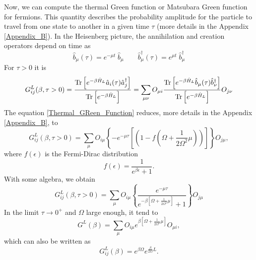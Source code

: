 Now, we can compute the thermal Green function or Matsubara Green function for fermions. This quantity describes the probability amplitude for the particle to travel from one state to another in a given time $\tau$ (more details in the Appendix \ref{Appendix_B}).
In the Heisenberg picture, the annihilation and creation operators depend on time \cite{Coleman_2015} as
\begin{equation}
    \hat b_\mu (\tau) = e^{-\mu t}\; \hat b_\mu \qquad \hat b_\mu^\dagger (\tau) = e^{\mu t} \;\hat b_\mu^\dagger
\end{equation}
For $\tau > 0$ it is
\begin{equation}\label{Thermal_GReen_Function}
    \begin{split}
        G^L_{ij}(\beta, \tau > 0) &= \frac{\operatorname{Tr}\left[e^{-\beta \hat H_L}\hat a_i (\tau)  \hat a_j^\dagger\right]}{\operatorname{Tr}\left[e^{-\beta \hat H_L}\right]} =\sum_{\mu\nu} O_{\mu i}\frac{\operatorname{Tr}\left[ e^{-\beta \hat H_L} \hat b_\mu (\tau)\hat b_\nu^\dagger\right]}{\operatorname{Tr}\left[e^{-\beta \hat H_L}\right]}O_{j\nu}\\
    \end{split}
\end{equation}
The equation \eqref{Thermal_GReen_Function} reduces, more details in the Appendix \ref{Appendix_B}, to
\begin{equation}
    G^L_{ij}(\beta, \tau > 0) = \sum_{\mu} O_{i\mu}\left\{-e^{-\mu \tau}\left[\left(1-f\left( \Omega + \frac{1}{2\Omega^2}\mu\right)\right)\right]\right\}O_{j\mu},
\end{equation} 
where $f(\epsilon)$ is the Fermi-Dirac distribution
\begin{equation}
    f(\epsilon)=\frac{1}{e^{\beta\epsilon} + 1}.
\end{equation}
With some algebra, we obtain
\begin{equation}
    G^L_{ij}(\beta, \tau > 0) = \sum_{\mu} O_{i\mu}\left\{\frac{e^{-\mu \tau}}{e^{-\beta\left[ \Omega + \frac{1}{2\Omega^2}\mu\right]} + 1}\right\}O_{j\mu}
\end{equation}
In the limit $\tau \rightarrow 0^+$ and $\Omega$ large enough, it tend to
\begin{equation}\label{Quantum_correlation}
    G^L(\beta) = \sum_{\mu} O_{i\mu}{e^{\beta\left[ \Omega + \frac{1}{2\Omega^2}\mu\right]}} O_{\mu i},
\end{equation}
which can also be written as
\begin{equation}\label{quantum_correlation_2}
    G^L_{ij}(\beta)= e^{\beta \Omega}e^{\frac{\beta}{2\Omega}L}.
\end{equation}

